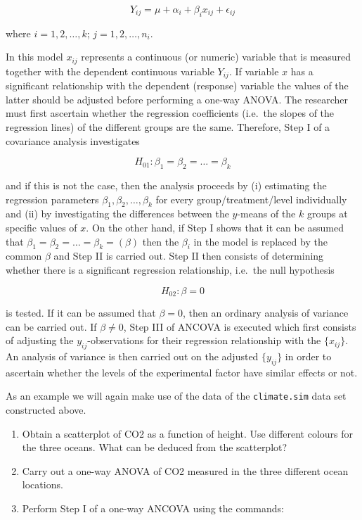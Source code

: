 \documentclass[
]{book}
\begin{document}
\[
Y_{ij} = \mu + \alpha_i + \beta_i x_{ij} + \epsilon_{ij}
\]

where \(i = 1, 2, \dots, k\); \(j = 1, 2, \dots, n_i\).

In this model \(x_{ij}\) represents a continuous (or numeric) variable that is measured together with the dependent continuous variable \(Y_{ij}\). If variable \(x\) has a significant relationship with the dependent (response) variable the values of the latter should be adjusted before performing a one-way ANOVA. The researcher must first ascertain whether the regression coefficients (i.e.~the slopes of the regression lines) of the different groups are the same. Therefore, {Step I} of a covariance analysis investigates

\[
H_{01}: \beta_1 = \beta_2 = \dots = \beta_k
\]

and if this is not the case, then the analysis proceeds by (i) estimating the regression parameters \(\beta_1, \beta_2, \dots, \beta_k\) for every group/treatment/level individually and (ii) by investigating the differences between the \(y\)-means of the \(k\) groups at specific values of \(x\). On the other hand, if Step I shows that it can be assumed that \(\beta_1 = \beta_2 = \dots = \beta_k = (\beta)\) then the \(\beta_i\) in the model is replaced by the common \(\beta\) and {Step II} is carried out. Step II then consists of determining whether there is a significant regression relationship, i.e.~the null hypothesis

\[
H_{02}: \beta = 0
\]

is tested. If it can be assumed that \(\beta = 0\), then an ordinary analysis of variance can be carried out. If \(\beta \neq 0\), {Step III} of ANCOVA is executed which first consists of adjusting the \(y_{ij}\)-observations for their regression relationship with the \(\{x_{ij} \}\). An analysis of variance is then carried out on the adjusted \(\{y_{ij} \}\) in order to ascertain whether the levels of the experimental factor have similar effects or not.

As an example we will again make use of the data of the \texttt{climate.sim} data set constructed above.

\begin{enumerate}
\def\labelenumi{(\alph{enumi})}
\item
  Obtain a scatterplot of CO2 as a function of height. Use different colours for the three oceans. What can be deduced from the scatterplot?
\item
  Carry out a one-way ANOVA of CO2 measured in the three different ocean locations.
\item
  Perform Step I of a one-way ANCOVA using the commands:
\end{enumerate}
\end{document}
